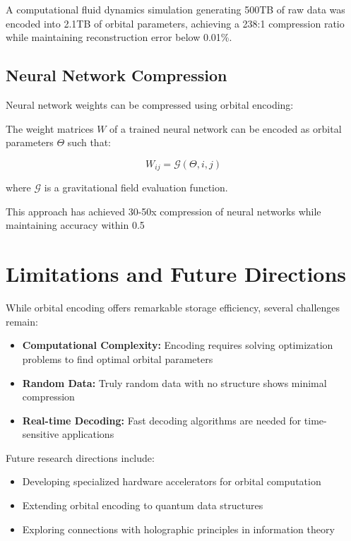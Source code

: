 \begin{example}
A computational fluid dynamics simulation generating 500TB of raw data was encoded into 2.1TB of orbital parameters, achieving a 238:1 compression ratio while maintaining reconstruction error below 0.01\%.
\end{example}

\subsection{Neural Network Compression}

Neural network weights can be compressed using orbital encoding:

\begin{proposition}
The weight matrices $W$ of a trained neural network can be encoded as orbital parameters $\Theta$ such that:

\begin{equation}
W_{ij} = \mathcal{G}(\Theta, i, j)
\end{equation}

where $\mathcal{G}$ is a gravitational field evaluation function.
\end{proposition}

This approach has achieved 30-50x compression of neural networks while maintaining accuracy within 0.5%

\section{Limitations and Future Directions}

While orbital encoding offers remarkable storage efficiency, several challenges remain:

\begin{itemize}
    \item \textbf{Computational Complexity:} Encoding requires solving optimization problems to find optimal orbital parameters
    \item \textbf{Random Data:} Truly random data with no structure shows minimal compression
    \item \textbf{Real-time Decoding:} Fast decoding algorithms are needed for time-sensitive applications
\end{itemize}

Future research directions include:

\begin{itemize}
    \item Developing specialized hardware accelerators for orbital computation
    \item Extending orbital encoding to quantum data structures
    \item Exploring connections with holographic principles in information theory
\end{itemize}

